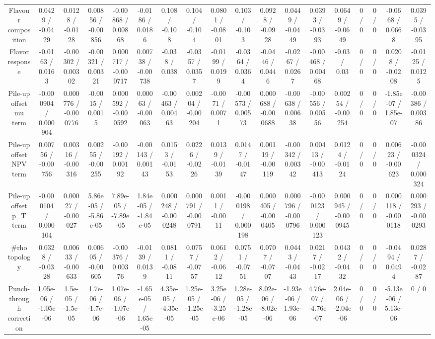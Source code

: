 \documentclass[10pt]{article}
\begin{document}
\begin{table}[htbp]
\begin{center}
\begin{tabular}{|c|c|c|c|c|c|c|c|c|c|c|c|c|c|c|c|c|c|}
  Flavour composition & 0.0429 / -0.0429 & 0.0128 / -0.0128 & 0.00856 / -0.00856 & -0.00868 / 0.00868 & -0.0186 / 0.0186 & 0.108 / -0.108 & 0.104 / -0.104 & 0.0801 / -0.0801 & 0.103 / -0.103 & 0.0928 / -0.0928 & 0.0449 / -0.0449 & 0.0393 / -0.0393 & 0.0649 / -0.0649 & 0 / 0 & 0 / 0 & -0.0668 / 0.0668 & 0.0395 / -0.0395 \\ 
  Flavor response & -0.0163 / 0.0163 & -0.00302 / 0.00302 & -0.00321 / 0.00321 & 0.000717 / -0.000717 & 0.00738 / -0.00738 & -0.038 / 0.038 & -0.0357 / 0.0357 & -0.0199 / 0.0199 & -0.0364 / 0.0364 & -0.0446 / 0.0446 & -0.0267 / 0.0267 & -0.00468 / 0.00468 & -0.03 / 0.03 & 0 / 0 & 0 / 0 & 0.0208 / -0.0208 & -0.0125 / 0.0125 \\ 
  Pile-up offset mu term & -0.000904 / 0.000904 & 0.000776 / -0.000776 & -0.0015 / 0.0015 & 0.000592 / -0.000592 & 0.00063 / -0.00063 & -0.00463 / 0.00463 & 0.00204 / -0.00204 & -0.0071 / 0.0071 & -0.00573 / 0.00573 & 0.000688 / -0.000688 & -0.00638 / 0.00638 & -0.00556 / 0.00556 & 0.00254 / -0.00254 & 0 / 0 & 0 / 0 & -1.85e-07 / 1.85e-07 & -0.00386 / 0.00386 \\ 
  Pile-up offset NPV term & 0.00756 / -0.00756 & 0.00316 / -0.00316 & 0.00255 / -0.00255 & -0.00192 / 0.00192 & -0.00143 / 0.00143 & 0.0153 / -0.0153 & 0.0226 / -0.0226 & 0.0139 / -0.0139 & 0.0147 / -0.0147 & 0.00119 / -0.00119 & -0.00342 / 0.00342 & 0.00413 / -0.00413 & 0.0124 / -0.0124 & 0 / 0 & 0 / 0 & 0.00623 / -0.00623 & -0.000324 / 0.000324 \\ 
  Pile-up offset p_{T} term & -0.000104 / 0.000104 & 0.00027 / -0.00027 & 5.86e-05 / -5.86e-05 & 7.89e-05 / -7.89e-05 & 1.84e-05 / -1.84e-05 & 0.000248 / -0.000248 & 0.000791 / -0.000791 & 0.0011 / -0.0011 & -0.000198 / 0.000198 & 0.000405 / -0.000405 & 0.000796 / -0.000796 & -0.000123 / 0.000123 & 0.000945 / -0.000945 & 0 / 0 & 0 / 0 & 0.000118 / -0.000118 & 0.000293 / -0.000293 \\ 
  #rho topology & 0.0328 / -0.0328 & 0.00633 / -0.00633 & 0.00605 / -0.00605 & -0.00376 / 0.00376 & -0.0139 / 0.0139 & 0.0811 / -0.0811 & 0.0757 / -0.0757 & 0.0612 / -0.0612 & 0.0751 / -0.0751 & 0.0707 / -0.0707 & 0.0443 / -0.0443 & 0.0217 / -0.0217 & 0.0432 / -0.0432 & 0 / 0 & 0 / 0 & -0.0494 / 0.0494 & 0.0287 / -0.0287 \\ 
  Punch-through correction & 1.05e-06 / -1.05e-06 & 1.5e-05 / -1.5e-05 & 1.7e-06 / -1.7e-06 & 1.07e-06 / -1.07e-06 & -1.65e-05 / 1.65e-05 & 4.35e-05 / -4.35e-05 & 1.25e-05 / -1.25e-05 & 3.25e-06 / -3.25e-06 & 1.28e-05 / -1.28e-05 & 8.02e-06 / -8.02e-06 & -1.93e-06 / 1.93e-06 & 4.76e-07 / -4.76e-07 & 2.04e-06 / -2.04e-06 & 0 / 0 & 0 / 0 & -5.13e-06 / 5.13e-06 & 0 / 0 \\ 

\end{tabular}
\end{center}
\end{table}
\end{document}
